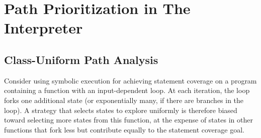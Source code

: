 

%



\section{Path Prioritization in The Interpreter}
\label{sec:chef:strategies}





\subsection{Class-Uniform Path Analysis}

Consider using symbolic execution for achieving statement coverage on a program containing a function with an input-dependent loop.  At each iteration, the loop forks one additional state (or exponentially many, if there are branches in the loop). A strategy that selects states to explore uniformly is therefore biased toward selecting more states from this function, at the expense of states in other functions that fork less but contribute equally to the statement coverage goal.

